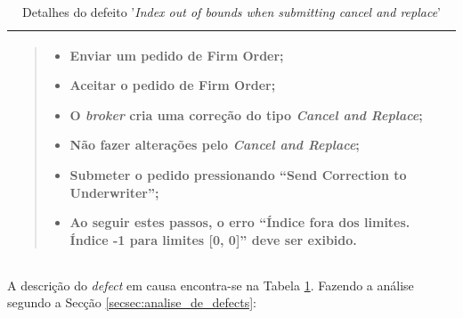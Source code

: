 \begin{table}[htbp]
\begin{tabularx}{1\textwidth}{|>{\raggedright\arraybackslash}X|}
\begin{quote}
\begin{itemize}
\begin{itemize}
                                \item Enviar um pedido de Firm Order;

                                \item Aceitar o pedido de Firm Order;

                                \item O \textit{broker} cria uma correção do tipo \textit{Cancel and Replace};

                                \item Não fazer alterações pelo \textit{Cancel and Replace};

                                \item Submeter o pedido pressionando ``Send Correction to Underwriter'';

                                \item Ao seguir estes passos, o erro ``Índice fora dos limites. Índice -1 para limites [0, 0]'' deve ser exibido.
                            \end{itemize}
                        \end{itemize}
                    \end{quote}

                    \\
                    \hline
                \end{tabularx}
                \caption{Detalhes do defeito '\textit{Index out of bounds when submitting cancel and replace}'}\label{table:defect1}
              \end{table}


                A descrição do \textit{defect} em causa encontra-se na Tabela \ref{table:defect1}. Fazendo a análise segundo a Secção \ref{secsec:analise_de_defects}:

